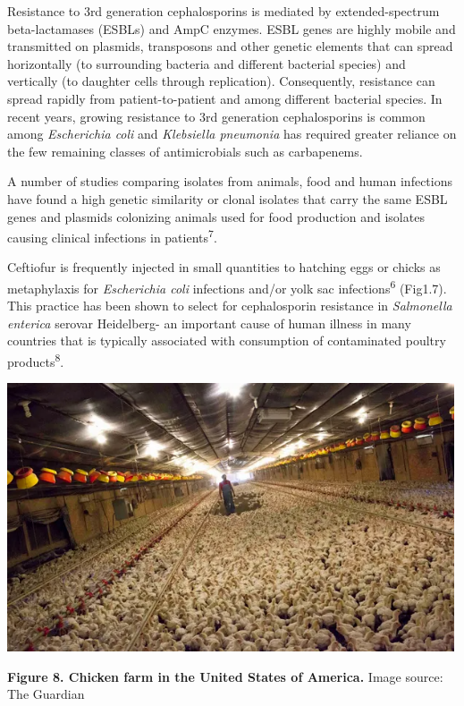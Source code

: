\documentclass[
]{book}
\begin{document}
Resistance to 3rd generation cephalosporins is mediated by extended-spectrum beta-lactamases (ESBLs) and AmpC enzymes. ESBL genes are highly mobile and transmitted on plasmids, transposons and other genetic elements that can spread horizontally (to surrounding bacteria and different bacterial species) and vertically (to daughter cells through replication). Consequently, resistance can spread rapidly from patient-to-patient and among different bacterial species. In recent years, growing resistance to 3rd generation cephalosporins is common among \emph{Escherichia coli} and \emph{Klebsiella pneumonia} has required greater reliance on the few remaining classes of antimicrobials such as carbapenems.

A number of studies comparing isolates from animals, food and human infections have found a high genetic similarity or clonal isolates that carry the same ESBL genes and plasmids colonizing animals used for food production and isolates causing clinical infections in patients\textsuperscript{7}.

Ceftiofur is frequently injected in small quantities to hatching eggs or chicks as metaphylaxis for \emph{Escherichia coli} infections and/or yolk sac infections\textsuperscript{6} (Fig1.7). This practice has been shown to select for cephalosporin resistance in \emph{Salmonella enterica} serovar Heidelberg- an important cause of human illness in many countries that is typically associated with consumption of contaminated poultry products\textsuperscript{8}.

\includegraphics[width=5.20833in,height=\textheight]{images/chicken_farm.png}

\textbf{Figure 8. Chicken farm in the United States of America.} Image source: The Guardian
\end{document}
